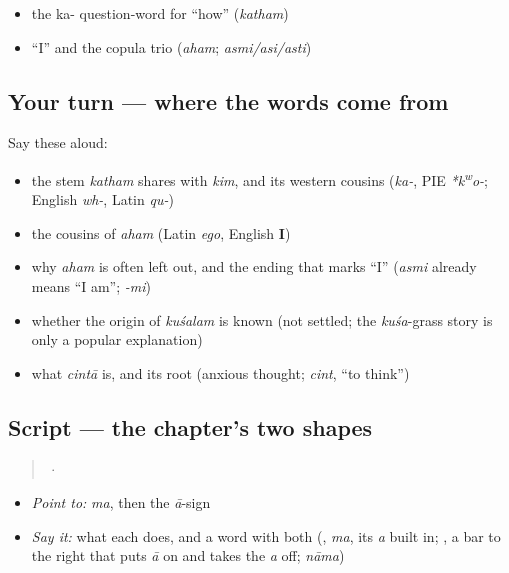 \begin{itemize}
\raggedright
  \item the ka- question-word for \textquotedblleft{}how\textquotedblright{} (\emph{katham})
  \item \textquotedblleft{}I\textquotedblright{} and the copula trio (\emph{aham}; \emph{asmi/asi/asti})
\end{itemize}

\subsection*{Your turn — where the words come from}
Say these aloud:

\begin{itemize}
\raggedright
  \item the stem \emph{katham} shares with \emph{kim}, and its western cousins (\emph{ka-}, PIE \emph{*k\textsuperscript{w}o-}; English \emph{wh-}, Latin \emph{qu-})
  \item the cousins of \emph{aham} (Latin \emph{ego}, English \textbf{I})
  \item why \emph{aham} is often left out, and the ending that marks \textquotedblleft{}I\textquotedblright{} (\emph{asmi} already means \textquotedblleft{}I am\textquotedblright{}; \emph{-mi})
  \item whether the origin of \emph{kuśalam} is known (not settled; the \emph{kuśa}-grass story is only a popular explanation)
  \item what \emph{cintā} is, and its root (anxious thought; \emph{cint}, \textquotedblleft{}to think\textquotedblright{})
\end{itemize}

\subsection*{Script — the chapter's two shapes}
\begin{quote}
 · 
\end{quote}

\begin{itemize}
\raggedright
  \item \emph{Point to:} \emph{ma}, then the \emph{ā}-sign
  \item \emph{Say it:} what each does, and a word with both (\textbf{}, \emph{ma}, its \emph{a} built in; \textbf{}, a bar to the right that puts \emph{ā} on and takes the \emph{a} off; \emph{nāma})
\end{itemize}

